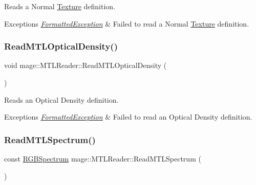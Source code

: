 Reads a Normal \hyperlink{classmage_1_1_texture}{Texture} definition.


\begin{DoxyExceptions}{Exceptions}
{\em \hyperlink{structmage_1_1_formatted_exception}{Formatted\+Exception}} & Failed to read a Normal \hyperlink{classmage_1_1_texture}{Texture} definition. \\
\hline
\end{DoxyExceptions}
\hypertarget{classmage_1_1_m_t_l_reader_a06576927d764c9cd2be41871f137fac4}{}\label{classmage_1_1_m_t_l_reader_a06576927d764c9cd2be41871f137fac4} 
\subsubsection{\texorpdfstring{Read\+M\+T\+L\+Optical\+Density()}{ReadMTLOpticalDensity()}}
{\footnotesize\ttfamily void mage\+::\+M\+T\+L\+Reader\+::\+Read\+M\+T\+L\+Optical\+Density (\begin{DoxyParamCaption}{ }\end{DoxyParamCaption})\hspace{0.3cm}{\ttfamily [private]}}

Reads an Optical Density definition.


\begin{DoxyExceptions}{Exceptions}
{\em \hyperlink{structmage_1_1_formatted_exception}{Formatted\+Exception}} & Failed to read an Optical Density definition. \\
\hline
\end{DoxyExceptions}
\hypertarget{classmage_1_1_m_t_l_reader_a607a55ab2e68d3bc9b879d7e3377f0e3}{}\label{classmage_1_1_m_t_l_reader_a607a55ab2e68d3bc9b879d7e3377f0e3} 
\subsubsection{\texorpdfstring{Read\+M\+T\+L\+Spectrum()}{ReadMTLSpectrum()}}
{\footnotesize\ttfamily const \hyperlink{structmage_1_1_r_g_b_spectrum}{R\+G\+B\+Spectrum} mage\+::\+M\+T\+L\+Reader\+::\+Read\+M\+T\+L\+Spectrum (\begin{DoxyParamCaption}{ }\end{DoxyParamCaption})\hspace{0.3cm}{\ttfamily [private]}}

